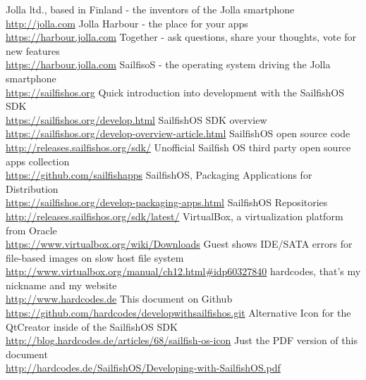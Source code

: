 \begin{thebibliography}{xxxxxxxxxxxx}
%
%
  Jolla ltd., based in Finland - the inventors of the Jolla smartphone \\\url{http://jolla.com}
 Jolla Harbour - the place for your apps \\\url{https://harbour.jolla.com}
 Together - ask questions, share your thoughts, vote for new features \\\url{https://harbour.jolla.com}
	SailfisoS - the operating system driving the Jolla smartphone \\\url{https://sailfishos.org}
 Quick introduction into development with the SailfishOS SDK \\\url{https://sailfishos.org/develop.html}
 SailfishOS SDK overview \\\url{https://sailfishos.org/develop-overview-article.html}
 SailfishOS open source code \\\url{http://releases.sailfishos.org/sdk/}
 Unofficial Sailfish OS third party open source apps collection \\\url{https://github.com/sailfishapps}
 SailfishOS, Packaging Applications for Distribution\\\url{https://sailfishos.org/develop-packaging-apps.html}
 SailfishOS Repositories \\\url{http://releases.sailfishos.org/sdk/latest/}
%
%
 VirtualBox, a virtualization platform from Oracle\\\url{https://www.virtualbox.org/wiki/Downloads}
 Guest shows IDE/SATA errors for file-based images on slow host file system\\\url{http://www.virtualbox.org/manual/ch12.html#idp60327840}
%
%
 hardcodes, that's my nickname and my website\\\url{http://www.hardcodes.de}
 This document on Github\\\url{https://github.com/hardcodes/developwithsailfishos.git}
 Alternative Icon for the QtCreator inside of the SailfishOS SDK\\\url{http://blog.hardcodes.de/articles/68/sailfish-os-icon}
 Just the PDF version of this document \\\url{http://hardcodes.de/SailfishOS/Developing-with-SailfishOS.pdf}

\end{thebibliography}
